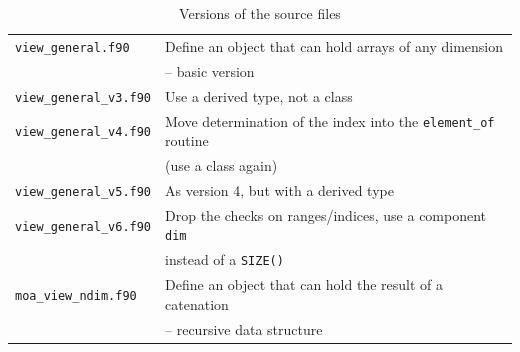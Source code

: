 \documentclass[onecolumn]{article}
\begin{document}
\begin{table}
\caption{Versions of the source files}
\begin{tabular}{ll}
\hline
\verb+view_general.f90+          & Define an object that can hold arrays of any dimension                  \\
                                 & -- basic version                                                        \\
\verb+view_general_v3.f90+       & Use a derived type, not a class                                         \\
\verb+view_general_v4.f90+       & Move determination of the index into the \verb+element_of+ routine      \\
                                 & (use a class again)                                                     \\
\verb+view_general_v5.f90+       & As version 4, but with a derived type                                   \\
\verb+view_general_v6.f90+       & Drop the checks on ranges/indices, use a component \verb+dim+           \\
                                 & instead of a \verb+SIZE()+                                              \\
                                                                                                                                                                                                                                                                                                                                                                                                                                                                                                                                                                                                                                                                                                                                                                                                                                                                                                                                                                                                                                                          \hline
\verb+moa_view_ndim.f90+         & Define an object that can hold the result of a catenation               \\
                                 & -- recursive data structure                                             \\

\end{tabular}
\end{table}
\end{document}
